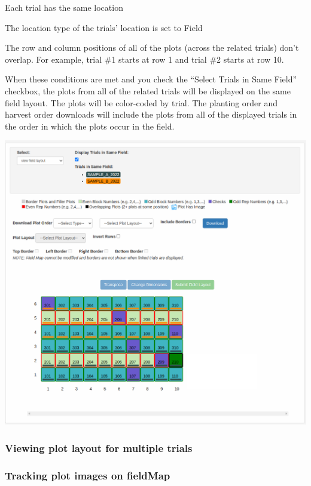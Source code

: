 \documentclass[
  12pt,
]{book}
\begin{document}
Each trial has the same location

The location type of the trials' location is set to Field

The row and column positions of all of the plots (across the related trials) don't overlap. For example, trial \#1 starts at row 1 and trial \#2 starts at row 10.

When these conditions are met and you check the ``Select Trials in Same Field'' checkbox, the plots from all of the related trials will be displayed on the same field layout. The plots will be color-coded by trial. The planting order and harvest order downloads will include the plots from all of the displayed trials in the order in which the plots occur in the field.

\begin{center}\includegraphics[width=0.95\linewidth]{assets/images/fieldmap_multi_trial_layout} \end{center}

\hypertarget{viewing-plot-layout-for-multiple-trials}{%
\subsubsection{Viewing plot layout for multiple trials}\label{viewing-plot-layout-for-multiple-trials}}

\hypertarget{tracking-plot-images-on-fieldmap}{%
\subsubsection*{Tracking plot images on fieldMap}\label{tracking-plot-images-on-fieldmap}}
\end{document}
